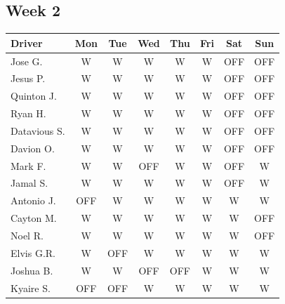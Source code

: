 \documentclass[11pt]{article}
\begin{document}
\subsection{Week 2}
\label{sec:orge4ed700}
\begin{center}
\begin{tabular}{l c c c c c c c}
\toprule
Driver & Mon & Tue & Wed & Thu & Fri & Sat & Sun\\
\midrule
Jose G. & W & W & W & W & W & OFF & OFF\\
Jesus P. & W & W & W & W & W & OFF & OFF\\
Quinton J. & W & W & W & W & W & OFF & OFF\\
Ryan H. & W & W & W & W & W & OFF & OFF\\
Datavious S. & W & W & W & W & W & OFF & OFF\\
Davion O. & W & W & W & W & W & OFF & OFF\\
Mark F. & W & W & OFF & W & W & OFF & W\\
Jamal S. & W & W & W & W & W & OFF & W\\
Antonio J. & OFF & W & W & W & W & W & W\\
Cayton M. & W & W & W & W & W & W & OFF\\
Noel R. & W & W & W & W & W & W & OFF\\
Elvis G.R. & W & OFF & W & W & W & W & W\\
Joshua B. & W & W & OFF & OFF & W & W & W\\
Kyaire S. & OFF & OFF & W & W & W & W & W\\
\bottomrule
\end{tabular}
\end{center}

\vspace{1em}
\end{document}
